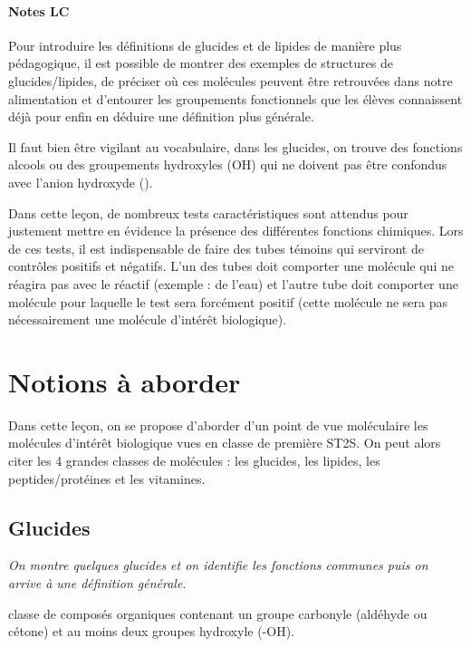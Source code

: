 \documentclass[11pt]{report}
\numberwithin{figure}{section}
\numberwithin{equation}{section}
\numberwithin{table}{section}
\newcommand{\1}{\boldsymbol{1}}
\begin{document}
\paragraph{Notes LC} Pour introduire les définitions de glucides et de lipides de manière plus pédagogique, il est possible
de montrer des exemples de structures de glucides/lipides, de préciser où ces molécules peuvent
être retrouvées dans notre alimentation et d’entourer les groupements fonctionnels que les élèves connaissent déjà pour enfin en déduire une définition plus générale.

Il faut bien être vigilant au vocabulaire, dans les glucides, on trouve des fonctions alcools ou des
groupements hydroxyles (OH) qui ne doivent pas être confondus avec l’anion hydroxyde (). 

Dans cette leçon, de nombreux tests caractéristiques sont attendus pour justement mettre en
évidence la présence des différentes fonctions chimiques. Lors de ces tests, il est indispensable de
faire des tubes témoins qui serviront de contrôles positifs et négatifs. L’un des tubes doit comporter
une molécule qui ne réagira pas avec le réactif (exemple : de l’eau) et l’autre tube doit comporter
une molécule pour laquelle le test sera forcément positif (cette molécule ne sera pas nécessairement une molécule d’intérêt biologique).



\section{Notions à aborder}

Dans cette leçon, on se propose d’aborder d’un point de vue moléculaire les molécules d’intérêt biologique vues en classe de première ST2S. On peut alors citer les 4 grandes classes de molécules :
les glucides, les lipides, les peptides/protéines et les vitamines. 

\subsection{Glucides}

\textit{On montre quelques glucides et on identifie les fonctions communes puis on arrive à une définition générale.}

classe de composés organiques contenant un groupe carbonyle (aldéhyde ou cétone) et au moins deux groupes hydroxyle (-OH).
\end{document}

